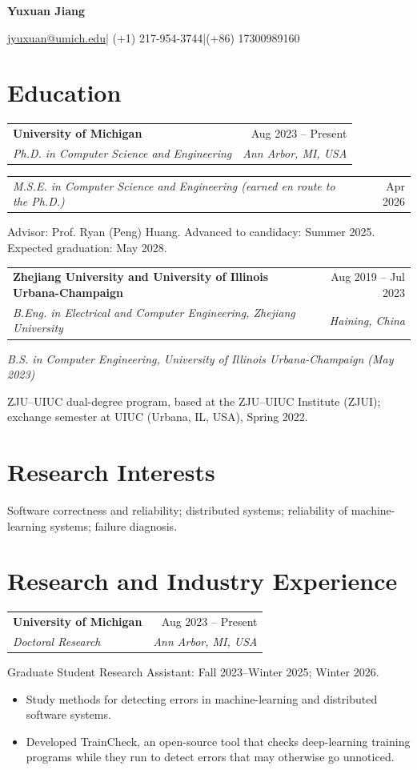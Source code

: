 \documentclass[11pt,letterpaper]{article}
\makeatletter
\newcommand{\entry}[4]{\Needspace{4\baselineskip}%
  \begin{tabularx}{\textwidth}{@{}Xr@{}}\textbf{#1} & #2\\
  \textit{#3} & \textit{#4}\end{tabularx}\par}
\makeatother
\begin{document}
\begin{center}
{\LARGE\bfseries Yuxuan Jiang}\par\vspace{0.25em}
\href{mailto:jyuxuan@umich.edu}{jyuxuan@umich.edu}\quad|\quad
(+1) 217-954-3744\quad|\quad (+86) 17300989160
\end{center}

\section*{Education}

\entry{University of Michigan}{Aug 2023 -- Present}
{Ph.D. in Computer Science and Engineering}{Ann Arbor, MI, USA}
\begin{tabularx}{\textwidth}{@{}Xr@{}}
    \textit{M.S.E. in Computer Science and Engineering (earned en route to the Ph.D.)} & Apr 2026
\end{tabularx}\par
Advisor: Prof. Ryan (Peng) Huang. Advanced to candidacy: Summer 2025. Expected graduation: May 2028.\par
\vspace{0.3em}

\entry{Zhejiang University and University of Illinois Urbana-Champaign}{Aug 2019 -- Jul 2023}
{B.Eng. in Electrical and Computer Engineering, Zhejiang University}{Haining, China}
\textit{B.S. in Computer Engineering, University of Illinois Urbana-Champaign (May 2023)}\par
ZJU--UIUC dual-degree program, based at the ZJU--UIUC Institute (ZJUI);
exchange semester at UIUC (Urbana, IL, USA), Spring 2022.

\section*{Research Interests}

Software correctness and reliability; distributed systems; reliability of
machine-learning systems; failure diagnosis.

\section*{Research and Industry Experience}

\entry{University of Michigan}{Aug 2023 -- Present}
{Doctoral Research}{Ann Arbor, MI, USA}
Graduate Student Research Assistant: Fall 2023--Winter 2025; Winter 2026.
\begin{itemize}
\item Study methods for detecting errors in machine-learning and distributed software systems.
\item Developed TrainCheck, an open-source tool that checks deep-learning training programs while they run to detect errors that may otherwise go unnoticed.
\end{itemize}
\vspace{0.2em}
\end{document}
